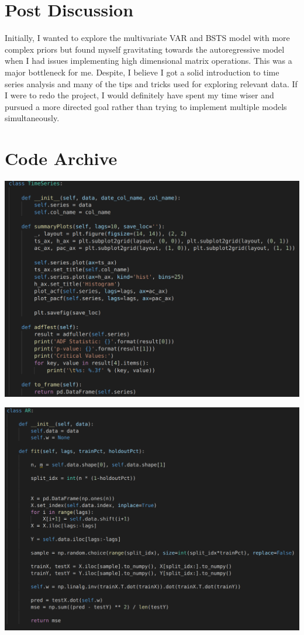 \documentclass{article}
\begin{document}
\section*{Post Discussion}

Initially, I wanted to explore the multivariate VAR  and BSTS model with more complex priors but found myself gravitating towards the autoregressive model when I had issues implementing high dimensional matrix operations. This was a major bottleneck for me. Despite, I believe I got a solid introduction to time series analysis and many of the tips and tricks used for exploring relevant data. If I were to redo the project, I would definitely have spent my time wiser and pursued a more directed goal rather than trying to implement multiple models simultaneously.

\section*{Code Archive}

\includegraphics[width=\textwidth]{../output/code2.png}

\includegraphics[width=\textwidth]{../output/code3.png}
\end{document}
